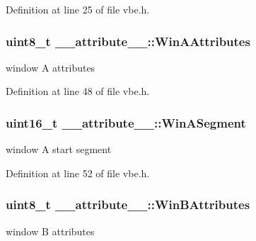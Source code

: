 Definition at line 25 of file vbe.\+h.

\hypertarget{struct____attribute_____aeffe4dec59c5a757f65a97a66c812d3b}{}
\subsubsection[{Win\+A\+Attributes}]{\setlength{\rightskip}{0pt plus 5cm}uint8\+\_\+t \+\_\+\+\_\+attribute\+\_\+\+\_\+\+::\+Win\+A\+Attributes}\label{struct____attribute_____aeffe4dec59c5a757f65a97a66c812d3b}


window A attributes 



Definition at line 48 of file vbe.\+h.

\hypertarget{struct____attribute_____a7cde26f911e3df97b7498ee139d8de12}{}
\subsubsection[{Win\+A\+Segment}]{\setlength{\rightskip}{0pt plus 5cm}uint16\+\_\+t \+\_\+\+\_\+attribute\+\_\+\+\_\+\+::\+Win\+A\+Segment}\label{struct____attribute_____a7cde26f911e3df97b7498ee139d8de12}


window A start segment 



Definition at line 52 of file vbe.\+h.

\hypertarget{struct____attribute_____ac9e21a3d7d22b24ed82be39f790b1408}{}
\subsubsection[{Win\+B\+Attributes}]{\setlength{\rightskip}{0pt plus 5cm}uint8\+\_\+t \+\_\+\+\_\+attribute\+\_\+\+\_\+\+::\+Win\+B\+Attributes}\label{struct____attribute_____ac9e21a3d7d22b24ed82be39f790b1408}


window B attributes 



